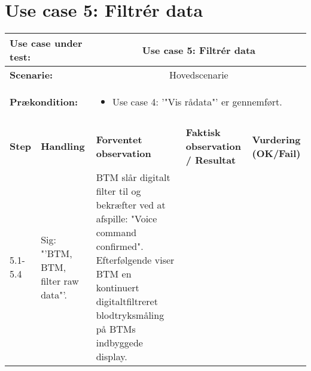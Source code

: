 \section{Use case 5: Filtrér data}
\begin{tabular}{|p{1cm}|p{3cm}|p{4cm}|p{4cm}|p{2cm}|}
\hline
\multicolumn{2}{|p{3cm}|}{\textbf{Use case under test:}} & \multicolumn{3}{c|}{Use case 5: Filtrér data} \\\hline

\multicolumn{2}{|p{3cm}|}{\textbf{Scenarie:}} & \multicolumn{3}{c|}{Hovedscenarie} \\\hline

\multicolumn{2}{|p{3cm}|}{\textbf{Prækondition:}}  & \multicolumn{3}{l|}{\parbox{0.6\textwidth}{
\begin{itemize}[label=$\circ$]
\item Use case 4: '"Vis rådata"' er gennemført. 
\end{itemize} }}\\\hline

\multicolumn{5}{|c|}{} \\\hline

\textbf{Step} & \textbf{Handling} & \textbf{Forventet observation} & \textbf{Faktisk observation / Resultat} & \textbf{Vurdering (OK/Fail)}\\\hline

5.1-5.4 & Sig: "'BTM, BTM, filter raw data"'. & BTM slår digitalt filter til og bekræfter ved at afspille: "Voice command confirmed". Efterfølgende viser BTM en kontinuert digitaltfiltreret blodtryksmåling på BTMs indbyggede display. &  & \\\hline

\end{tabular}

